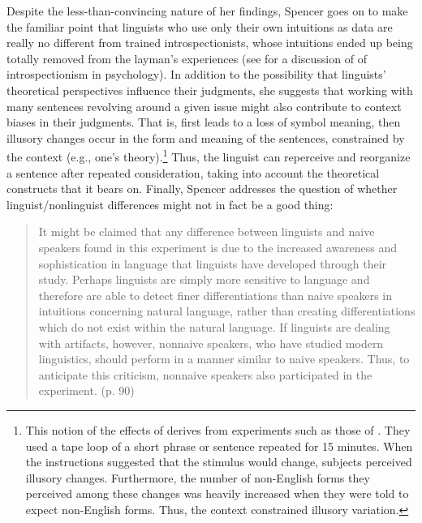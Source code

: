 Despite the less-than-convincing nature of her findings, Spencer goes on to make the familiar point that linguists who use only their own intuitions as data are really no different from trained introspectionists, whose intuitions ended up being totally removed from the layman's experiences (see  for a discussion of  of introspectionism in psychology). In addition to the possibility that linguists' theoretical perspectives influence their judgments, she suggests that working with many sentences revolving around a given issue might also contribute to context biases in their judgments. That is,  first leads to a loss of symbol meaning, then illusory changes occur in the form and meaning of the sentences, constrained by the context (e.g., one's theory).\footnote{This notion of the effects of  derives from experiments such as those of \citet{TaylorEtAl1963}. They used a tape loop of a short phrase or sentence repeated for 15 minutes. When the instructions suggested that the stimulus would change, subjects perceived illusory changes. Furthermore, the number of non-English forms they perceived among these changes was heavily increased when they were told to expect non-English forms. Thus, the context constrained illusory variation.
}
 Thus, the linguist can reperceive and reorganize a sentence after repeated consideration, taking into account the theoretical constructs that it bears on. Finally, Spencer addresses the question of whether linguist/nonlinguist differences might not in fact be a good thing:

 \begin{quote}
It might be claimed that any difference between linguists and naive speakers found in this experiment is due to the increased awareness and sophistication in language that linguists have developed through their study. Perhaps linguists are simply more sensitive to language and therefore are able to detect finer differentiations than naive speakers in intuitions concerning natural language, rather than creating differentiations which do not exist within the natural language. If linguists are dealing with artifacts, however, nonnaive speakers, who have studied modern linguistics, should perform in a manner similar to naive speakers. Thus, to anticipate this criticism, nonnaive speakers also participated in the experiment. (p. 90)
 \end{quote}

